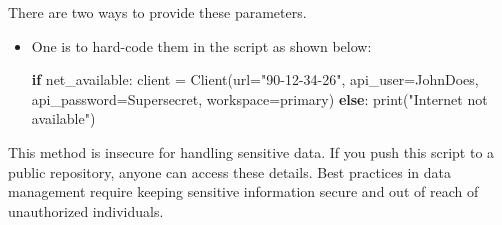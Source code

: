 \documentclass[
  letterpaper,
  DIV=11,
  numbers=noendperiod]{scrreprt}
\newenvironment{Shaded}{\begin{snugshade}}{\end{snugshade}}
\newcommand{\BuiltInTok}[1]{\textcolor[rgb]{0.00,0.23,0.31}{#1}}
\newcommand{\ControlFlowTok}[1]{\textcolor[rgb]{0.00,0.23,0.31}{\textbf{#1}}}
\newcommand{\NormalTok}[1]{\textcolor[rgb]{0.00,0.23,0.31}{#1}}
\newcommand{\OperatorTok}[1]{\textcolor[rgb]{0.37,0.37,0.37}{#1}}
\newcommand{\StringTok}[1]{\textcolor[rgb]{0.13,0.47,0.30}{#1}}
\begin{document}
There are two ways to provide these parameters.

\begin{itemize}
\item
  One is to hard-code them in the script as shown below:

\begin{Shaded}
\begin{Highlighting}[]
\ControlFlowTok{if}\NormalTok{ net\_available:}
\NormalTok{  client }\OperatorTok{=}\NormalTok{ Client(url}\OperatorTok{=}\StringTok{"90{-}12{-}34{-}26"}\NormalTok{, }
\NormalTok{  api\_user}\OperatorTok{=}\StringTok{\textquotesingle{}JohnDoes\textquotesingle{}}\NormalTok{, }
\NormalTok{  api\_password}\OperatorTok{=}\StringTok{\textquotesingle{}Supersecret\textquotesingle{}}\NormalTok{, }
\NormalTok{  workspace}\OperatorTok{=}\StringTok{\textquotesingle{}primary\textquotesingle{}}\NormalTok{)}
\ControlFlowTok{else}\NormalTok{:}
  \BuiltInTok{print}\NormalTok{(}\StringTok{"Internet not available"}\NormalTok{)}
\end{Highlighting}
\end{Shaded}
\end{itemize}

This method is insecure for handling sensitive data. If you push this
script to a public repository, anyone can access these details. Best
practices in data management require keeping sensitive information
secure and out of reach of unauthorized individuals.
\end{document}
